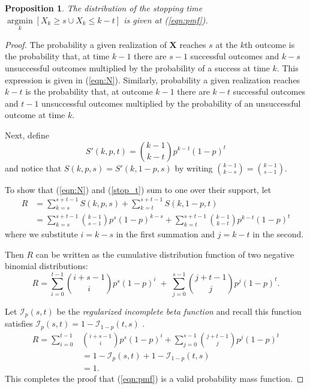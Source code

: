 \documentclass[review]{elsarticle}
\DeclareMathOperator*{\argmin}{argmin}
\newcommand*{\argminl}{\argmin\limits}
\newtheorem{prop}{Proposition}
\begin{document}
\begin{prop}
The distribution of the stopping time
$\argminl_k \left[X_k \geq s \cup X_k \leq k-t \right]$
is given at (\ref{eqn:pmf}).
\end{prop}
\begin{proof}

The probability a given realization of $\mathbf{X}$ reaches $s$ at
the $k$th outcome is the probability that, at time $k-1$ there are $s-1$
successful outcomes and $k-s$ unsuccessful outcomes multiplied by
the probability of a success at time $k$. This expression is given
in (\ref{eqn:N}). 
Similarly, probability a given realization reaches $k-t$
is the probability that, at outcome $k-1$ there are $k-t$ successful outcomes
and $t-1$ unsuccessful outcomes multiplied by the probability of an
unsuccessful outcome at time $k$.  

Next, define
\begin{equation} \label{stop_t}
S'(k, p, t) = {k-1 \choose k-t} p^{k-t} (1-p)^t
\end{equation}
and notice that $S(k, p, s) = S'(k, 1-p, s)$ by writing
${k-1 \choose k-s} = {k-1 \choose s-1}$.

To show that (\ref{eqn:N}) and (\ref{stop_t}) sum to one
over their support, let
\begin{align} \label{eqn:sum_proof}
R &= \sum_{k=s}^{s+t-1} S(k, p, s) + \sum_{k=t}^{s+t-1} S(k, 1-p, t) \\
  &= \sum_{k=s}^{s+t-1} {k-1 \choose s-1} p^s (1-p)^{k-s} + \sum_{k=t}^{s+t-1} {k-1 \choose k-t} p^{k-t} (1-p)^t
\end{align}
where we substitute $i=k-s$ in the first summation and $j=k-t$ in the second.

Then $R$ can be written as the cumulative distribution function of two
negative binomial distributions:
\begin{equation} \label{eqn:transformed_sum}
R = \sum_{i=0}^{t-1} {i+s-1 \choose i} p^s (1-p)^i \; + \;
\sum_{j=0}^{s-1} {j+t-1 \choose j} p^j (1-p)^t.
\end{equation}

Let $\mathcal{I}_p(s, t)$ be the {\em regularized incomplete beta function} 
\citep{Olver2010} and recall this function satisfies 
$\mathcal{I}_p(s, t) = 1-\mathcal{I}_{1-p}(t, s)$ \citep{Abramowitz1964}.
\begin{align*}
R = \sum_{i=0}^{t-1} &{i+s-1 \choose i} p^s (1-p)^i +
\sum_{j=0}^{s-1}  {j+t-1 \choose j} p^j  (1-p)^t \\
   &= 1-\mathcal{I}_p(s, t) + 1 - \mathcal{I}_{1-p}(t, s) \\
   &= 1. 
\end{align*}
This completes the proof that (\ref{eqn:pmf}) is a valid probability mass
function.
\end{proof}
\end{document}
